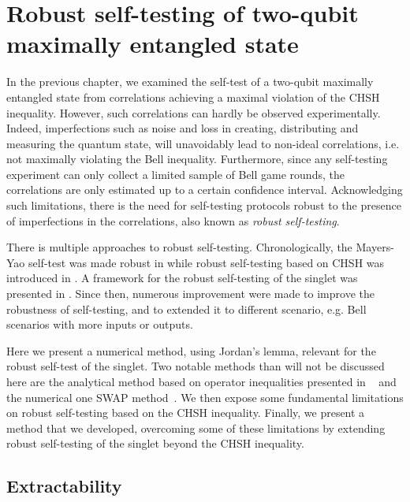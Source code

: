 \chapter{Robust self-testing of two-qubit maximally entangled state}

In the previous chapter, we examined the self-test of a two-qubit maximally entangled state from correlations achieving a maximal violation of the CHSH inequality.
However, such correlations can hardly be observed experimentally. 
Indeed, imperfections such as noise and loss in creating, distributing and measuring the quantum state, will unavoidably lead to non-ideal correlations, i.e. not maximally violating the Bell inequality.
Furthermore, since any self-testing experiment can only collect a limited sample of Bell game rounds, the correlations are only estimated up to a certain confidence interval. %
Acknowledging such limitations, there is the need for self-testing protocols robust to the presence of imperfections in the correlations, also known as \textit{robust self-testing}.

There is multiple approaches to robust self-testing. 
Chronologically, the Mayers-Yao self-test was made robust in \cite{Magniez2006} while robust self-testing based on CHSH was introduced in \cite{Bardyn2009}.
A framework for the robust self-testing of the singlet was presented in \cite{McKague2012}.
Since then, numerous improvement were made to improve the robustness of self-testing, and to extended it to different scenario, e.g. Bell scenarios with more inputs or outputs.

Here we present a numerical method, using Jordan's lemma, relevant for the robust self-test of the singlet. 
Two notable methods than will not be discussed here are the analytical method based on operator inequalities presented in ~\cite{Kaniewski2016} and the numerical one SWAP method~\cite{Bancal2015}.
We then expose some fundamental limitations on robust self-testing based on the CHSH inequality.
Finally, we present a method that we developed, overcoming some of these limitations by extending robust self-testing of the singlet beyond the CHSH inequality.

\section{Extractability}

